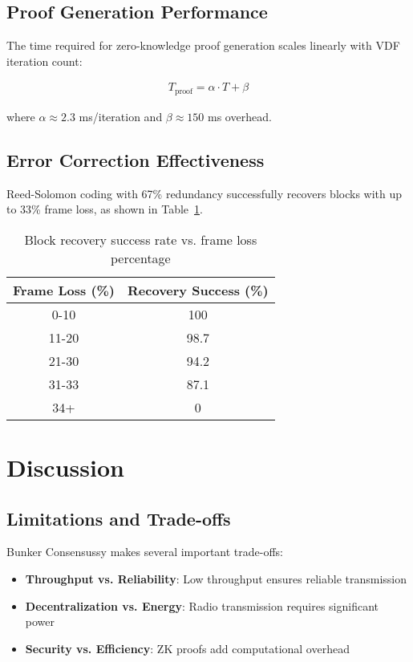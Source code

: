 \documentclass[11pt,a4paper]{article}
\begin{document}
\subsection{Proof Generation Performance}

The time required for zero-knowledge proof generation scales linearly with VDF iteration count:

\begin{align}
T_{\text{proof}} = \alpha \cdot T + \beta
\end{align}

where $\alpha \approx 2.3$ ms/iteration and $\beta \approx 150$ ms overhead.

\subsection{Error Correction Effectiveness}

Reed-Solomon coding with 67\% redundancy successfully recovers blocks with up to 33\% frame loss, as shown in Table~\ref{tab:error_correction}.

\begin{table}[h]
\centering
\caption{Block recovery success rate vs. frame loss percentage}
\label{tab:error_correction}
\begin{tabular}{@{}cc@{}}
\toprule
Frame Loss (\%) & Recovery Success (\%) \\
\midrule
0-10 & 100 \\
11-20 & 98.7 \\
21-30 & 94.2 \\
31-33 & 87.1 \\
34+ & 0 \\
\bottomrule
\end{tabular}
\end{table}

\section{Discussion}

\subsection{Limitations and Trade-offs}

Bunker Consensussy makes several important trade-offs:

\begin{itemize}
\item \textbf{Throughput vs. Reliability}: Low throughput ensures reliable transmission
\item \textbf{Decentralization vs. Energy}: Radio transmission requires significant power
\item \textbf{Security vs. Efficiency}: ZK proofs add computational overhead
\end{itemize}
\end{document}
